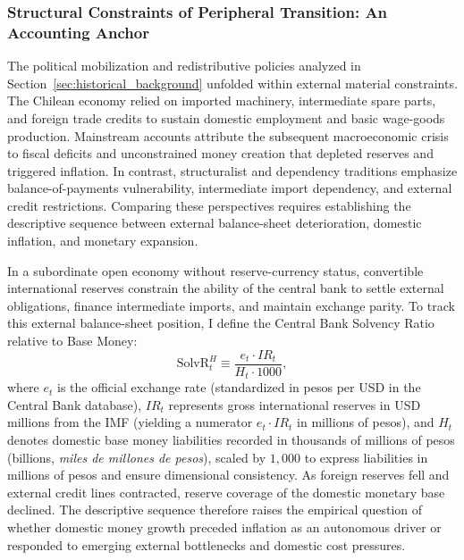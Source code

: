 
\subsubsection{Structural Constraints of Peripheral Transition: An Accounting Anchor}
\label{sec:stylized_material_bounds}

The political mobilization and redistributive policies analyzed in Section~\ref{sec:historical_background} unfolded within external material constraints. The Chilean economy relied on imported machinery, intermediate spare parts, and foreign trade credits to sustain domestic employment and basic wage-goods production. Mainstream accounts \citep{DornbuschEdwards1990,Edwards2024} attribute the subsequent macroeconomic crisis to fiscal deficits and unconstrained money creation that depleted reserves and triggered inflation. In contrast, structuralist and dependency traditions \citep{Stallings1978,DeVylder1976} emphasize balance-of-payments vulnerability, intermediate import dependency, and external credit restrictions. Comparing these perspectives requires establishing the descriptive sequence between external balance-sheet deterioration, domestic inflation, and monetary expansion.

In a subordinate open economy without reserve-currency status, convertible international reserves constrain the ability of the central bank to settle external obligations, finance intermediate imports, and maintain exchange parity. To track this external balance-sheet position, I define the Central Bank Solvency Ratio relative to Base Money:
\begin{equation}
    \text{SolvR}^{H}_t \equiv \frac{e_t \cdot IR_t}{H_t \cdot 1000},
    \label{eq:solvency_ratio_base_def}
\end{equation}
where $e_t$ is the official exchange rate (standardized in pesos per USD in the Central Bank database), $IR_t$ represents gross international reserves in USD millions from the IMF (yielding a numerator $e_t \cdot IR_t$ in millions of pesos), and $H_t$ denotes domestic base money liabilities recorded in thousands of millions of pesos (billions, \emph{miles de millones de pesos}), scaled by $1{,}000$ to express liabilities in millions of pesos and ensure dimensional consistency. As foreign reserves fell and external credit lines contracted, reserve coverage of the domestic monetary base declined. The descriptive sequence therefore raises the empirical question of whether domestic money growth preceded inflation as an autonomous driver or responded to emerging external bottlenecks and domestic cost pressures.

